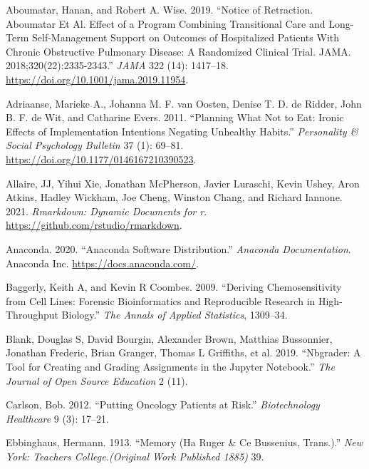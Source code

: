 \documentclass[
  12 pt,
]{paper}
\newlength{\cslhangindent}
\newlength{\cslentryspacingunit} %
\newenvironment{CSLReferences}[2] %
 {%
  \setlength{\parindent}{0pt}
  \ifodd #1
  \let\oldpar\par
  \def\par{\hangindent=\cslhangindent\oldpar}
  \fi
  \setlength{\parskip}{#2\cslentryspacingunit}
 }%
 {}
\begin{document}
\hypertarget{refs}{}
\begin{CSLReferences}{1}{0}
\leavevmode{}%
Aboumatar, Hanan, and Robert A. Wise. 2019. {``Notice of {Retraction}. {Aboumatar} Et Al. {Effect} of a {Program Combining Transitional Care} and {Long}-Term {Self}-Management {Support} on {Outcomes} of {Hospitalized Patients With Chronic Obstructive Pulmonary Disease}: {A Randomized Clinical Trial}. {JAMA}. 2018;320(22):2335-2343.''} \emph{JAMA} 322 (14): 1417--18. \url{https://doi.org/10.1001/jama.2019.11954}.

\leavevmode{}%
Adriaanse, Marieke A., Johanna M. F. van Oosten, Denise T. D. de Ridder, John B. F. de Wit, and Catharine Evers. 2011. {``Planning What Not to Eat: Ironic Effects of Implementation Intentions Negating Unhealthy Habits.''} \emph{Personality \& Social Psychology Bulletin} 37 (1): 69--81. \url{https://doi.org/10.1177/0146167210390523}.

\leavevmode{}%
Allaire, JJ, Yihui Xie, Jonathan McPherson, Javier Luraschi, Kevin Ushey, Aron Atkins, Hadley Wickham, Joe Cheng, Winston Chang, and Richard Iannone. 2021. \emph{Rmarkdown: Dynamic Documents for r}. \url{https://github.com/rstudio/rmarkdown}.

\leavevmode{}%
Anaconda. 2020. {``Anaconda Software Distribution.''} \emph{Anaconda Documentation}. Anaconda Inc. \url{https://docs.anaconda.com/}.

\leavevmode{}%
Baggerly, Keith A, and Kevin R Coombes. 2009. {``Deriving Chemosensitivity from Cell Lines: Forensic Bioinformatics and Reproducible Research in High-Throughput Biology.''} \emph{The Annals of Applied Statistics}, 1309--34.

\leavevmode{}%
Blank, Douglas S, David Bourgin, Alexander Brown, Matthias Bussonnier, Jonathan Frederic, Brian Granger, Thomas L Griffiths, et al. 2019. {``Nbgrader: A Tool for Creating and Grading Assignments in the Jupyter Notebook.''} \emph{The Journal of Open Source Education} 2 (11).

\leavevmode{}%
Carlson, Bob. 2012. {``Putting {Oncology Patients} at {Risk}.''} \emph{Biotechnology Healthcare} 9 (3): 17--21.

\leavevmode{}%
Ebbinghaus, Hermann. 1913. {``Memory (Ha Ruger \& Ce Bussenius, Trans.).''} \emph{New York: Teachers College.(Original Work Published 1885)} 39.


\end{CSLReferences}
\end{document}

